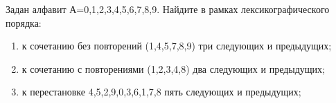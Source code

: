 \question 
Задан алфавит А={0,1,2,3,4,5,6,7,8,9}. Найдите в рамках лексикографического порядка:
\begin{enumerate}
\item  к сочетанию без повторений (1,4,5,7,8,9) три следующих и предыдущих;
\item  к сочетанию с повторениями (1,2,3,4,8) два следующих и предыдущих;
\item  к перестановке 4,5,2,9,0,3,6,1,7,8 пять следующих и предыдущих;
\end{enumerate}
